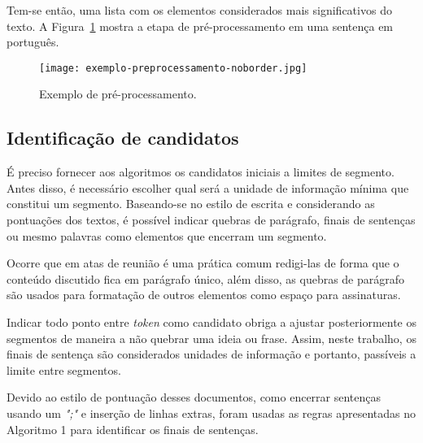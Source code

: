 	



Tem-se então, uma lista com os elementos considerados mais significativos do texto. A Figura~\ref{fig:exemplopreprocessamento} mostra a etapa de pré-processamento em uma sentença em português.
	



  \begin{figure}[!h]
	\centering
	\texttt{[image: exemplo-preprocessamento-noborder.jpg]}
	\caption{Exemplo de pré-processamento.}
	\label{fig:exemplopreprocessamento}
  \end{figure}







\subsection{Identificação de candidatos}
	\label{subsec:indentificacaosentencas}
	
	
	
	É preciso fornecer aos algoritmos os candidatos iniciais a limites de segmento. Antes disso, é necessário escolher qual será a unidade de informação mínima que constitui um segmento. Baseando-se no estilo de escrita e considerando as pontuações dos textos, é possível indicar quebras de parágrafo, finais de sentenças ou mesmo palavras como elementos que encerram um segmento. 

	Ocorre que em atas de reunião é uma prática comum redigi-las de forma que o conteúdo discutido fica em parágrafo único, além disso, as quebras de parágrafo são usados para formatação de outros elementos como espaço para assinaturas. 

	Indicar todo ponto entre \textit{token} como candidato obriga a ajustar posteriormente os segmentos de maneira a não quebrar uma ideia ou frase. Assim, neste trabalho, os finais de sentença são considerados unidades de informação e portanto, passíveis a limite entre segmentos. 
	
	Devido ao estilo de pontuação desses documentos, como encerrar sentenças usando um \textit{";"} e inserção de linhas extras, foram usadas as regras apresentadas no Algoritmo 1 para identificar os finais de sentenças.  


